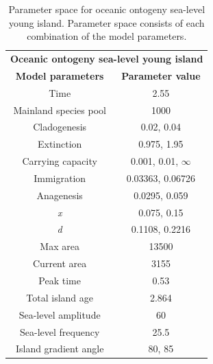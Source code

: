 \begin{table}[h]
    \centering
    \caption{Parameter space for oceanic ontogeny sea-level young island. Parameter space consists of each combination of the model parameters.}
    \begin{tabular}{ c | c }
        \multicolumn{2}{c}{\textbf{Oceanic ontogeny sea-level young island}} \\
        \textbf{Model parameters} & \textbf{Parameter value} \\ 
        \hline
        \hline
        Time & 2.55 \\
        \hline
        Mainland species pool & 1000 \\
        \hline
        Cladogenesis & 0.02, 0.04 \\
        \hline
        Extinction & 0.975, 1.95 \\
        \hline
        Carrying capacity & 0.001, 0.01, $\infty$ \\
        \hline
        Immigration & 0.03363, 0.06726 \\
        \hline
        Anagenesis & 0.0295, 0.059 \\
        \hline
        \textit{x} & 0.075, 0.15 \\
        \hline
        \textit{d} & 0.1108, 0.2216 \\
        \hline
        Max area & 13500 \\
        \hline
        Current area & 3155 \\
        \hline
        Peak time & 0.53 \\
        \hline
        Total island age & 2.864 \\
        \hline
        Sea-level amplitude & 60 \\
        \hline
        Sea-level frequency & 25.5 \\
        \hline
        Island gradient angle & 80, 85 \\
    \end{tabular}
    \label{tab:oceanic_ontogeny_sea_level_young}
\end{table}


